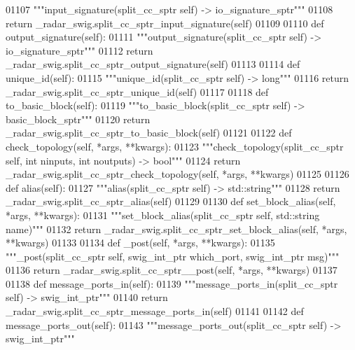 \begin{DoxyCode}
{{{{{01107         \textcolor{stringliteral}{"""input\_signature(split\_cc\_sptr self) -> io\_signature\_sptr"""}
01108         \textcolor{keywordflow}{return} \_radar\_swig.split\_cc\_sptr\_input\_signature(self)
01109 
01110     \textcolor{keyword}{def }output_signature(self):
01111         \textcolor{stringliteral}{"""output\_signature(split\_cc\_sptr self) -> io\_signature\_sptr"""}
01112         \textcolor{keywordflow}{return} \_radar\_swig.split\_cc\_sptr\_output\_signature(self)
01113 
01114     \textcolor{keyword}{def }unique_id(self):
01115         \textcolor{stringliteral}{"""unique\_id(split\_cc\_sptr self) -> long"""}
01116         \textcolor{keywordflow}{return} \_radar\_swig.split\_cc\_sptr\_unique\_id(self)
01117 
01118     \textcolor{keyword}{def }to_basic_block(self):
01119         \textcolor{stringliteral}{"""to\_basic\_block(split\_cc\_sptr self) -> basic\_block\_sptr"""}
01120         \textcolor{keywordflow}{return} \_radar\_swig.split\_cc\_sptr\_to\_basic\_block(self)
01121 
01122     \textcolor{keyword}{def }check_topology(self, *args, **kwargs):
01123         \textcolor{stringliteral}{"""check\_topology(split\_cc\_sptr self, int ninputs, int noutputs) -> bool"""}
01124         \textcolor{keywordflow}{return} \_radar\_swig.split\_cc\_sptr\_check\_topology(self, *args, **kwargs)
01125 
01126     \textcolor{keyword}{def }alias(self):
01127         \textcolor{stringliteral}{"""alias(split\_cc\_sptr self) -> std::string"""}
01128         \textcolor{keywordflow}{return} \_radar\_swig.split\_cc\_sptr\_alias(self)
01129 
01130     \textcolor{keyword}{def }set_block_alias(self, *args, **kwargs):
01131         \textcolor{stringliteral}{"""set\_block\_alias(split\_cc\_sptr self, std::string name)"""}
01132         \textcolor{keywordflow}{return} \_radar\_swig.split\_cc\_sptr\_set\_block\_alias(self, *args, **kwargs)
01133 
01134     \textcolor{keyword}{def }_post(self, *args, **kwargs):
01135         \textcolor{stringliteral}{"""\_post(split\_cc\_sptr self, swig\_int\_ptr which\_port, swig\_int\_ptr msg)"""}
01136         \textcolor{keywordflow}{return} \_radar\_swig.split\_cc\_sptr\_\_post(self, *args, **kwargs)
01137 
01138     \textcolor{keyword}{def }message_ports_in(self):
01139         \textcolor{stringliteral}{"""message\_ports\_in(split\_cc\_sptr self) -> swig\_int\_ptr"""}
01140         \textcolor{keywordflow}{return} \_radar\_swig.split\_cc\_sptr\_message\_ports\_in(self)
01141 
01142     \textcolor{keyword}{def }message_ports_out(self):
01143         \textcolor{stringliteral}{"""message\_ports\_out(split\_cc\_sptr self) -> swig\_int\_ptr"""}
}}}}}
\end{DoxyCode}
